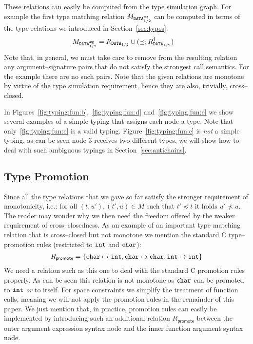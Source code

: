 \documentclass{sigplanconf}
\newcommand{\ms}[1]{\mathsf{#1}}
\newcommand{\mt}[1]{\text{\tt #1}}
\begin{document}
These relations can easily be computed from the type simulation
graph. For example the first type matching relation
$M_{\mt{DATA}^\ms{arg}_{1/2}}$ can be computed in terms of the type
relations we introduced in Section~\ref{sec:types}:
\begin{align*}
M_{\mt{DATA}^\ms{arg}_{1/2}} &= R_{\mt{DATA}_{1/2}} \cup ( \preceq ;
R^\dagger_{\mt{DATA}_{1/2}} )
\end{align*}
Note that, in general, we must take care to remove from the resulting
relation any argument--signature pairs that do not satisfy the
strongest call semantics. For the example there are no such pairs. 
Note that the given relations are monotone by virtue of the type
simulation requirement, hence they are also, trivially, cross--closed.

In Figures~\ref{fig:typing:fun:b},~\ref{fig:typing:fun:d}
and~\ref{fig:typing:fun:e} we show several examples of a simple typing
that assigns each node a type. Note that only~\ref{fig:typing:fun:e} is a
valid typing. Figure~\ref{fig:typing:fun:c} is \emph{not} a simple
typing, as can be seen node 3 receives two different types, we will
show how to deal with such ambiguous typings in
Section~\ref{sec:antichains}.

\subsection{Type Promotion}

Since all the type relations that we gave so far satisfy the stronger
requirement of monotonicity, i.e.: for all $(t, u'), (t', u) \in M$
such that $t' \preceq t$ it holds $u' \not\prec u$. The reader may
wonder why we then need the freedom offered by the weaker requirement
of cross--closedness. As an example of an important type matching
relation that is cross--closed but not monotone we mention the
standard C type--promotion rules (restricted to $\mt{int}$ and
$\mt{char}$):
\begin{align*}
R_\ms{promote} = \{ \mt{char} \mapsto \mt{int}, \mt{char} \mapsto
  \mt{char}, \mt{int} \mapsto \mt{int} \}
\end{align*}
We need a relation such as this one to deal with the standard C
promotion rules properly. As can be seen this relation is not monotone
as $\mt{char}$ can be promoted to $\mt{int}$ \emph{or} to itself. For
space constraints we simplify the treatment of function calls, meaning
we will not apply the promotion rules in the remainder of this
paper. We just mention that, in practice, promotion rules can easily
be implemented by introducing such an additional relation
$R_\ms{promote}$ between the outer argument expression syntax node and
the inner function argument syntax node.
\end{document}
